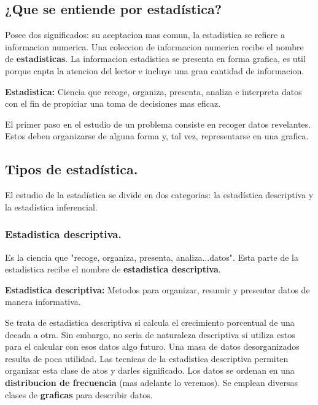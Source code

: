 \documentclass[]{article}
\begin{document}
\subsection{¿Que se entiende por estadística?}
Posee dos significados: su aceptacion mas comun, la estadistica se refiere a informacion numerica. Una coleccion de informacion numerica recibe el nombre de \textbf{estadisticas}. La informacion estadistica se presenta en forma grafica, es util porque capta la atencion del lector e incluye una gran cantidad de informacion. 
\begin{flushleft}
\textbf{Estadistica:} Ciencia que recoge, organiza, presenta, analiza e interpreta datos con el fin de propiciar una toma de decisiones mas eficaz.
\end{flushleft}
El primer paso en el estudio de un problema consiste en recoger datos revelantes. Estos deben organizarse de alguna forma y, tal vez, representarse en una grafica.
\subsection{Tipos de estadística.}
El estudio de la estadística se divide en dos categorias: la estadística descriptiva y la estadística inferencial.
\subsubsection*{Estadistica descriptiva.}
Es la ciencia que "recoge, organiza, presenta, analiza...datos". Esta parte de la estadistica recibe el nombre de \textbf{estadistica descriptiva}.

\begin{flushleft}
\textbf{Estadistica descriptiva:} Metodos para organizar, resumir y presentar datos de manera informativa.
\end{flushleft}
Se trata de estadistica descriptiva si calcula el crecimiento porcentual de una decada a otra. Sin embargo, no seria de naturaleza descriptiva si utiliza estos para el calcular con esos datos algo futuro.
Una masa de datos desorganizados resulta de poca utilidad. Las tecnicas de la estadistica descriptiva permiten organizar esta clase de atos y darles significado. Los datos se ordenan en una \textbf{distribucion de frecuencia} (mas adelante lo veremos). Se emplean diversas clases de \textbf{graficas} para describir datos.
\end{document}
